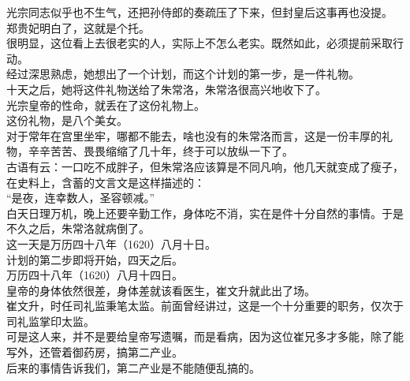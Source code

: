 \begin{multicols}{\theparacolNo}
光宗同志似乎也不生气，还把孙侍郎的奏疏压了下来，但封皇后这事再也没提。\\

郑贵妃明白了，这就是个托。\\

很明显，这位看上去很老实的人，实际上不怎么老实。既然如此，必须提前采取行动。\\

经过深思熟虑，她想出了一个计划，而这个计划的第一步，是一件礼物。\\

十天之后，她将这件礼物送给了朱常洛，朱常洛很高兴地收下了。\\

光宗皇帝的性命，就丢在了这份礼物上。\\

这份礼物，是八个美女。\\

对于常年在宫里坐牢，哪都不能去，啥也没有的朱常洛而言，这是一份丰厚的礼物，辛辛苦苦、畏畏缩缩了几十年，终于可以放纵一下了。\\

古语有云：一口吃不成胖子，但朱常洛应该算是不同凡响，他几天就变成了瘦子，在史料上，含蓄的文言文是这样描述的：\\

“是夜，连幸数人，圣容顿减。”\\

白天日理万机，晚上还要辛勤工作，身体吃不消，实在是件十分自然的事情。于是不久之后，朱常洛就病倒了。\\

这一天是万历四十八年（1620）八月十日。\\

计划的第二步即将开始，四天之后。\\

万历四十八年（1620）八月十四日。\\

皇帝的身体依然很差，身体差就该看医生，崔文升就此出了场。\\

崔文升，时任司礼监秉笔太监。前面曾经讲过，这是一个十分重要的职务，仅次于司礼监掌印太监。\\

可是这人来，并不是要给皇帝写遗嘱，而是看病，因为这位崔兄多才多能，除了能写外，还管着御药房，搞第二产业。\\

后来的事情告诉我们，第二产业是不能随便乱搞的。\\


\end{multicols}
